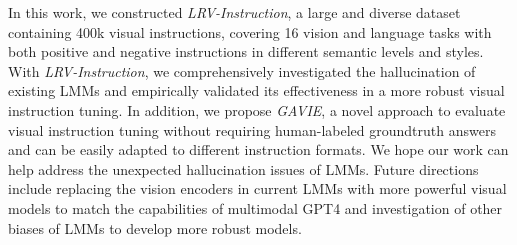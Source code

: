 \vspace{-0.1in}
In this work, we constructed \textit{LRV-Instruction}, a large and diverse dataset containing 400k visual instructions, covering 16 vision and language tasks with both positive and negative instructions in different semantic levels and styles. With \textit{LRV-Instruction}, we  comprehensively investigated the hallucination of existing LMMs and empirically validated its effectiveness in a more robust visual instruction tuning. In addition, we propose \textit{GAVIE}, a novel approach to evaluate visual instruction tuning without requiring human-labeled groundtruth answers and can be easily adapted to different instruction formats. We hope our work can help address the unexpected hallucination issues of LMMs. Future directions include replacing the vision encoders in current LMMs with more powerful visual models to match the capabilities of multimodal GPT4 and investigation of other biases of LMMs to develop more robust models.



